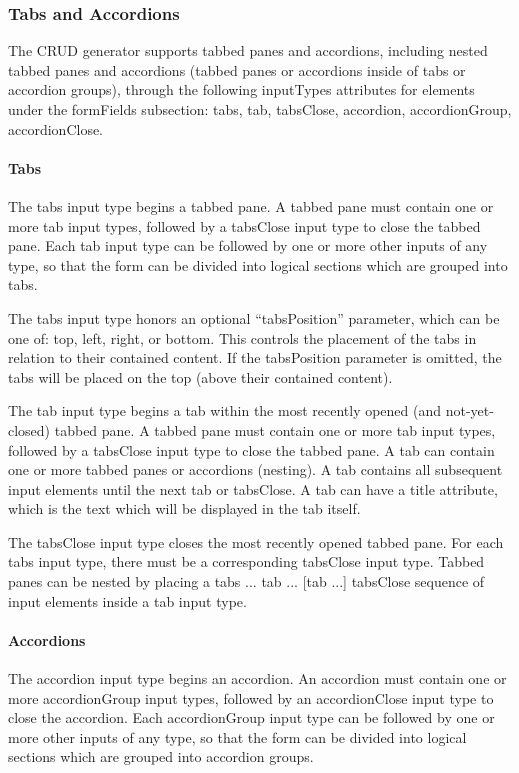 \documentclass[letterpaper,10pt,english]{sphinxmanual}
\begin{document}
\subsubsection{Tabs and Accordions}
\label{jaxFrameworkGuide:tabs-and-accordions}
The CRUD generator supports tabbed panes and accordions, including nested tabbed panes and
accordions (tabbed panes or accordions inside of tabs or accordion groups), through the following
inputTypes attributes for elements under the formFields subsection: tabs, tab, tabsClose, accordion,
accordionGroup, accordionClose.


\paragraph{Tabs}
\label{jaxFrameworkGuide:tabs}
The tabs input type begins a tabbed pane.  A tabbed pane must contain one or more tab input types,
followed by a tabsClose input type to close the tabbed pane.  Each tab input type can be followed by
one or more other inputs of any type, so that the form can be divided into logical sections which
are grouped into tabs.

The tabs input type honors an optional ``tabsPosition'' parameter, which can be one of: top, left,
right, or bottom.  This controls the placement of the tabs in relation to their contained content.
If the tabsPosition parameter is omitted, the tabs will be placed on the top (above their contained
content).

The tab input type begins a tab within the most recently opened (and not-yet-closed) tabbed pane.  A
tabbed pane must contain one or more tab input types, followed by a tabsClose input type to close
the tabbed pane.  A tab can contain one or more tabbed panes or accordions (nesting).  A tab
contains all subsequent input elements until the next tab or tabsClose.  A tab can have a title
attribute, which is the text which will be displayed in the tab itself.

The tabsClose input type closes the most recently opened tabbed pane.  For each tabs input type,
there must be a corresponding tabsClose input type.  Tabbed panes can be nested by placing a tabs
... tab ... {[}tab ...{]} tabsClose sequence of input elements inside a tab input type.


\paragraph{Accordions}
\label{jaxFrameworkGuide:accordions}
The accordion input type begins an accordion.  An accordion must contain one or more accordionGroup
input types, followed by an accordionClose input type to close the accordion.  Each accordionGroup
input type can be followed by one or more other inputs of any type, so that the form can be divided
into logical sections which are grouped into accordion groups.
\end{document}
